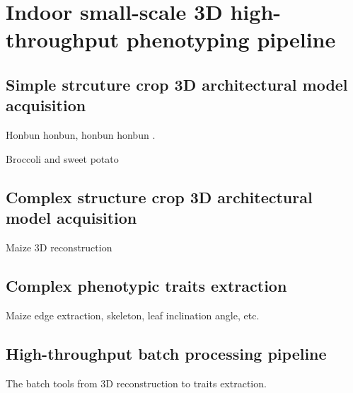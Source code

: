 \chapter{Indoor small-scale 3D high-throughput phenotyping pipeline}

\section{Simple strcuture crop 3D architectural model acquisition}

Honbun honbun, honbun honbun \citep{zhao_crop_2019}. 

Broccoli and sweet potato


\section{Complex structure crop 3D architectural model acquisition}

Maize 3D reconstruction

\newpage


\section{Complex phenotypic traits extraction}

Maize edge extraction, skeleton, leaf inclination angle, etc.

\section{High-throughput batch processing pipeline}

The batch tools from 3D reconstruction to traits extraction.